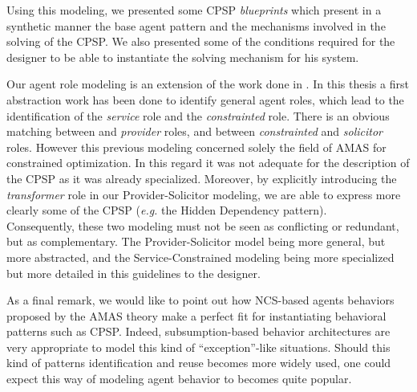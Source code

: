 Using this modeling, we presented some CPSP \emph{blueprints} which present in a synthetic manner the base agent pattern and the mechanisms involved in the solving of the CPSP. We also presented some of the conditions required for the designer to be able to instantiate the solving mechanism for his system.

Our agent role modeling is an extension of the work done in \cite{Ka2011.6}. In this thesis a first abstraction work has been done to identify general agent roles, which lead to the identification of the \emph{service} role and the \emph{constrainted} role. There is an obvious matching between  and \emph{provider} roles, and between \emph{constrainted} and \emph{solicitor} roles. However this previous modeling concerned solely the field of AMAS for constrained optimization. In this regard it was not adequate for the description of the CPSP as it was already specialized. Moreover, by explicitly introducing the \emph{transformer} role in our Provider-Solicitor modeling, we are able to express more clearly some of the CPSP (\emph{e.g.} the Hidden Dependency pattern).\\
Consequently, these two modeling must not be seen as conflicting or redundant, but as complementary. The Provider-Solicitor model being more general, but more abstracted, and the Service-Constrained modeling being more specialized but more detailed in this guidelines to the designer.

As a final remark, we would like to point out how NCS-based agents behaviors proposed by the AMAS theory make a perfect fit for instantiating behavioral patterns such as CPSP. Indeed, subsumption-based behavior architectures are very appropriate to model this kind of \enquote{exception}-like situations. Should this kind of patterns identification and reuse becomes more widely used, one could expect this way of modeling agent behavior to becomes quite popular.